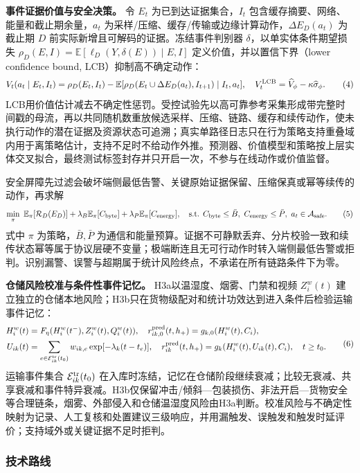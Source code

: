 \textbf{事件证据价值与安全决策。} 令 \(E_t\) 为已到达证据集合，\(I_t\) 包含缓存摘要、网络、能量和截止期余量，\(a_t\) 为采样/压缩、缓存/传输或边缘计算动作，\(\Delta E_D(a_t)\) 为截止期 \(D\) 前实际新增且可解码的证据。冻结事件判别器 \(\delta\)，以单实体条件期望损失 \(\rho_D(E,I)=\mathbb E[\ell_D(Y,\delta(E))\mid E,I]\) 定义价值，并以置信下界（lower confidence bound, LCB）抑制高不确定动作：
\[
V_t(a_t\mid E_t,I_t)=\rho_D(E_t,I_t)-\mathbb E[\rho_D(E_t\cup\Delta E_D(a_t),I_{t+1})\mid I_t,a_t],\quad
V_t^{\rm LCB}=\widehat V_\phi-\kappa\widehat\sigma_\phi.
\tag{4}
\]
LCB用价值估计减去不确定性惩罚。受控试验先以高可靠参考采集形成带完整时间戳的母流，再以共同随机数重放候选采样、压缩、链路、缓存和续传动作，使未执行动作的潜在证据及资源状态可追溯；真实单路径日志只在行为策略支持重叠域内用于离策略估计，支持不足时不给动作外推。预测器、价值模型和策略按上层实体交叉拟合，最终测试标签封存并只开启一次，不参与在线动作或价值监督。

安全屏障先过滤会破坏端侧最低告警、关键原始证据保留、压缩保真或幂等续传的动作，再求解
\[
\min_\pi\ \mathbb E_\pi[\mathcal R_D(E_D)]+\lambda_B\mathbb E_\pi[C_{\rm byte}]+\lambda_P\mathbb E_\pi[C_{\rm energy}],\quad
\text{s.t. }C_{\rm byte}\le\bar B,\ C_{\rm energy}\le\bar P,\ a_t\in\mathcal A_{\rm safe}.
\tag{5}
\]
式中 \(\pi\) 为策略，\(\bar B,\bar P\) 为通信和能量预算。证据不可静默丢弃、分片校验一致和续传状态幂等属于协议层硬不变量；极端断连且无可行动作时转入端侧最低告警或拒判。识别漏警、误警与超期属于统计风险终点，不承诺在所有链路条件下为零。

\textbf{仓储风险校准与条件性事件记忆。} H3a以温湿度、烟雾、门禁和视频 \(Z_i^w(t)\) 建立独立的仓储本地风险；H3b只在货物级配对和统计功效达到进入条件后检验运输事件记忆：
\[
\begin{aligned}
H_i^w(t)&=F_\eta(H_i^w(t^-),Z_i^w(t),Q_i^w(t)),\quad
r^{\rm pred}_{ik,0}(t,h_+)=g_{k,0}(H_i^w(t),C_i),\\
U_{ik}(t)&=\sum_{e\in\mathcal E_{ik}^{\rm tr}(t_0)}w_{ik,e}\exp[-\lambda_k(t-t_e)],\quad
r^{\rm pred}_{ik}(t,h_+)=g_k(H_i^w(t),U_{ik}(t),C_i),\quad t\ge t_0.
\end{aligned}
\tag{6}
\]
运输事件集合 \(\mathcal E_{ik}^{\rm tr}(t_0)\) 在入库时冻结，记忆在仓储阶段继续衰减；比较无衰减、共享衰减和事件特异衰减。H3b仅保留冲击/倾斜—包装损伤、非法开启—货物安全等合理链条，烟雾、外部侵入和仓储温湿度风险由H3a判断。校准风险与不确定性映射为记录、人工复核和处置建议三级响应，并用漏触发、误触发和触发时延评价；支持域外或关键证据不足时拒判。

\subsubsection{技术路线}

